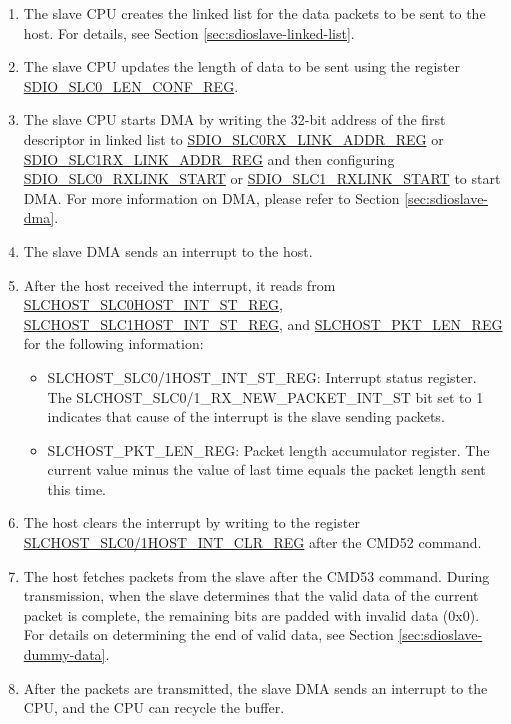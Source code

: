 \documentclass[main\_\_EN.tex]{subfiles}
\begin{document}
\begin{enumerate}
    \item The slave CPU creates the linked list for the data packets to be sent to the host. For details, see Section \ref{sec:sdioslave-linked-list}.
    \item The slave CPU updates the length of data to be sent using the register \hyperref[regdesc:SDIOSLC0LENCONFREG]{SDIO\_SLC0\_LEN\_CONF\_REG}.
    \item The slave CPU starts DMA by writing the 32-bit address of the first descriptor in linked list to \hyperref[regdesc:SDIOSLC0RXLINKADDRREG]{SDIO\_SLC0RX\_LINK\_ADDR\_REG} or \hyperref[regdesc:SDIOSLC1RXLINKADDRREG]{SDIO\_SLC1RX\_LINK\_ADDR\_REG} and then configuring \hyperref[fielddesc:SDIOSLC0RXLINKSTART]{SDIO\_SLC0\_RXLINK\_START} or \hyperref[fielddesc:SDIOSLC1RXLINKSTART]{SDIO\_SLC1\_RXLINK\_START} to start DMA. For more information on DMA, please refer to Section \ref{sec:sdioslave-dma}.
    \item The slave DMA sends an interrupt to the host.
    \item After the host received the interrupt, it reads from \hyperref[regdesc:SLCHOSTSLC0HOSTINTSTREG]{SLCHOST\_SLC0HOST\_INT\_ST\_REG}, \hyperref[regdesc:SLCHOSTSLC1HOSTINTSTREG]{SLCHOST\_SLC1HOST\_INT\_ST\_REG}, and \hyperref[regdesc:SLCHOSTPKTLENREG]{SLCHOST\_PKT\_LEN\_REG} for the following information:
    \begin{itemize}
        \item SLCHOST\_SLC0/1HOST\_INT\_ST\_REG: Interrupt status register. The SLCHOST\_SLC0/1\_RX\_NEW\_PACKET\_INT\_ST bit set to 1 indicates that cause of the interrupt is the slave sending packets.
        \item SLCHOST\_PKT\_LEN\_REG: Packet length accumulator register. The current value minus the value of last time equals the packet length sent this time.
    \end{itemize}
    \item The host clears the interrupt by writing to the register \hyperref[regdesc:SLCHOSTSLC1HOSTINTCLRREG] {SLCHOST\_SLC0/1HOST\_INT\_CLR\_REG} after the CMD52 command.
    \item The host fetches packets from the slave after the CMD53 command. During transmission, when the slave determines that the valid data of the current packet is complete, the remaining bits are padded with invalid data (0x0). For details on determining the end of valid data, see Section \ref{sec:sdioslave-dummy-data}.
    \item After the packets are transmitted, the slave DMA sends an interrupt to the CPU, and the CPU can recycle the buffer.
\end{enumerate}
\end{document}
